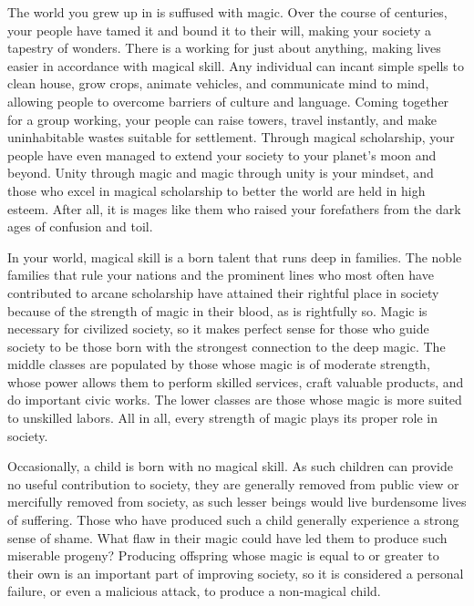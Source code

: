 \documentclass[blue]{guildcamp3}
\begin{document}
\name{\bMagicWorld{}}

The world you grew up in is suffused with magic. Over the course of centuries, your people have tamed it and bound it to their will, making your society a tapestry of wonders. There is a working for just about anything, making lives easier in accordance with magical skill. Any individual can incant simple spells to clean house, grow crops, animate vehicles, and communicate mind to mind, allowing people to overcome barriers of culture and language. Coming together for a group working, your people can raise towers, travel instantly, and make uninhabitable wastes suitable for settlement. Through magical scholarship, your people have even managed to extend your society to your planet's moon and beyond. Unity through magic and magic through unity is your mindset, and those who excel in magical scholarship to better the world are held in high esteem. After all, it is mages like them who raised your forefathers from the dark ages of confusion and toil.

In your world, magical skill is a born talent that runs deep in families. The noble families that rule your nations and the prominent lines who most often have contributed to arcane scholarship have attained their rightful place in society because of the strength of magic in their blood, as is rightfully so. Magic is necessary for civilized society, so it makes perfect sense for those who guide society to be those born with the strongest connection to the deep magic. The middle classes are populated by those whose magic is of moderate strength, whose power allows them to perform skilled services, craft valuable products, and do important civic works. The lower classes are those whose magic is more suited to unskilled labors. All in all, every strength of magic plays its proper role in society.

Occasionally, a child is born with no magical skill. As such children can provide no useful contribution to society, they are generally removed from public view or mercifully removed from society, as such lesser beings would live burdensome lives of suffering. Those who have produced such a child generally experience a strong sense of shame. What flaw in their magic could have led them to produce such miserable progeny? Producing offspring whose magic is equal to or greater to their own is an important part of improving society, so it is considered a personal failure, or even a malicious attack, to produce a non-magical child.
\end{document}

